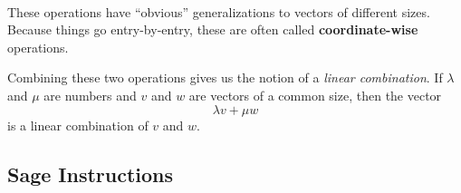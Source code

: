 \documentclass[10pt,]{book}
\newcommand{\terminology}[1]{\textbf{#1}}
\theoremstyle{plain}
\theoremstyle{definition}
\numberwithin{equation}{section}
\begin{document}
\paragraph[]{}\label{paragraph-3}
These operations have ``obvious'' generalizations to vectors of different sizes. Because things go entry-by-entry, these are often called \terminology{coordinate-wise} operations.%
\par
Combining these two operations gives us the notion of a \emph{linear combination}. If \(\lambda\) and \(\mu\) are numbers and \(v\) and \(w\) are vectors of a common size, then the vector \[\lambda v + \mu w \] is a linear combination of \(v\) and \(w\).%
\typeout{************************************************}
\typeout{************************************************}
\subsection[Sage Instructions]{Sage Instructions}\label{subsection-4}
\typeout{************************************************}
\typeout{************************************************}
\end{document}
